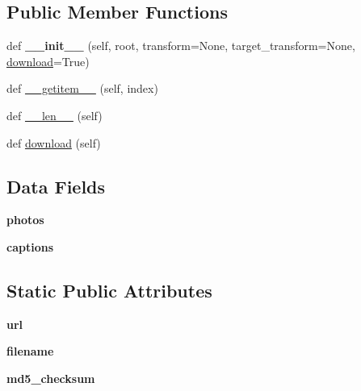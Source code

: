 \subsection*{Public Member Functions}
\begin{DoxyCompactItemize}
\item 
\mbox{\label{classtorchvision_1_1datasets_1_1sbu_1_1SBU_a51be13e32f7c874deacdcba95f066d90}} 
def {\bfseries \+\_\+\+\_\+init\+\_\+\+\_\+} (self, root, transform=None, target\+\_\+transform=None, \hyperlink{classtorchvision_1_1datasets_1_1sbu_1_1SBU_ab9cb0b9c60d1b93477910b4263803e25}{download}=True)
\item 
def \hyperlink{classtorchvision_1_1datasets_1_1sbu_1_1SBU_ab6f31fb52ca68fa57de0cd60c0f1a499}{\+\_\+\+\_\+getitem\+\_\+\+\_\+} (self, index)
\item 
def \hyperlink{classtorchvision_1_1datasets_1_1sbu_1_1SBU_a38bb2b1d57f2d97f386046d7525e108d}{\+\_\+\+\_\+len\+\_\+\+\_\+} (self)
\item 
def \hyperlink{classtorchvision_1_1datasets_1_1sbu_1_1SBU_ab9cb0b9c60d1b93477910b4263803e25}{download} (self)
\end{DoxyCompactItemize}
\subsection*{Data Fields}
\begin{DoxyCompactItemize}
\item 
\mbox{\label{classtorchvision_1_1datasets_1_1sbu_1_1SBU_a5e67a414f9fbba9608b4d05dc8b37bf1}} 
{\bfseries photos}
\item 
\mbox{\label{classtorchvision_1_1datasets_1_1sbu_1_1SBU_a6c91625480ee0f1974b6790dcf3206b7}} 
{\bfseries captions}
\end{DoxyCompactItemize}
\subsection*{Static Public Attributes}
\begin{DoxyCompactItemize}
\item 
\mbox{\label{classtorchvision_1_1datasets_1_1sbu_1_1SBU_ac06c47333ef9037ccbfa27d520a99429}} 
{\bfseries url}
\item 
\mbox{\label{classtorchvision_1_1datasets_1_1sbu_1_1SBU_aa3ef7f382dee5a40407bfc5f1d1ca4fa}} 
{\bfseries filename}
\item 
\mbox{\label{classtorchvision_1_1datasets_1_1sbu_1_1SBU_a377423ce99a84fd9a01ae0878f6fdc64}} 
{\bfseries md5\+\_\+checksum}
\end{DoxyCompactItemize}


